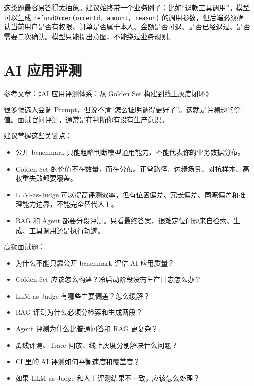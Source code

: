 \documentclass[10pt,a4paper]{ctexart}
\begin{document}
这类题最容易答得太抽象。建议始终带一个业务例子：比如“退款工具调用”。模型可以生成 \texttt{refundOrder(orderId, amount, reason)} 的调用参数，但后端必须确认当前用户是否有权限、订单是否属于本人、金额是否可退、是否已经退过、是否需要二次确认。模型只能提出意图，不能绕过业务规则。



\section{AI 应用评测}


参考文章：《AI 应用评测体系：从 Golden Set 构建到线上灰度闭环》



很多候选人会调 Prompt，但说不清“怎么证明调得更好了”。这就是评测题的价值。面试官问评测，通常是在判断你有没有生产意识。



建议掌握这些关键点：


\begin{itemize}[itemsep=2pt, topsep=4pt]
  \item 公开 benchmark 只能粗略判断模型通用能力，不能代表你的业务数据分布。
  \item Golden Set 的价值不在数量，而在分布。正常路径、边缘场景、对抗样本、高权重失败都要覆盖。
  \item LLM-as-Judge 可以提高评测效率，但有位置偏差、冗长偏差、同源偏差和推理能力边界，不能完全替代人工。
  \item RAG 和 Agent 都要分段评测。只看最终答案，很难定位问题来自检索、生成、工具调用还是执行轨迹。
\end{itemize}


高频面试题：


\begin{itemize}[itemsep=2pt, topsep=4pt]
  \item 为什么不能只靠公开 benchmark 评估 AI 应用质量？
  \item Golden Set 应该怎么构建？冷启动阶段没有生产日志怎么办？
  \item LLM-as-Judge 有哪些主要偏差？怎么缓解？
  \item RAG 评测为什么必须分检索和生成两段？
  \item Agent 评测为什么比普通问答和 RAG 更复杂？
  \item 离线评测、Trace 回放、线上灰度分别解决什么问题？
  \item CI 里的 AI 评测如何平衡速度和覆盖度？
  \item 如果 LLM-as-Judge 和人工评测结果不一致，应该怎么处理？
\end{itemize}
\end{document}
